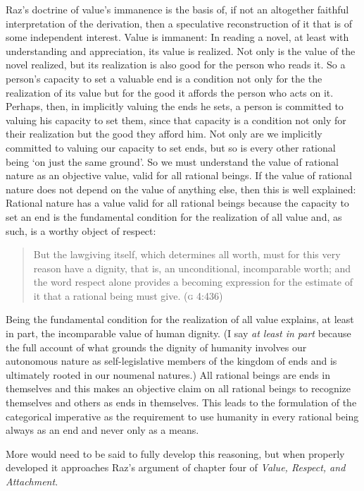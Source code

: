 \documentclass[a4paper,12pt]{article}
\begin{document}
Raz's doctrine of value's immanence is the basis of, if not an altogether faithful interpretation of the derivation, then a speculative reconstruction of it that is of some independent interest. Value is immanent: In reading a novel, at least with understanding and appreciation, its value is realized. Not only is the value of the novel realized, but its realization is also good for the person who reads it. So a person's capacity to set a valuable end is a condition not only for the the realization of its value but for the good it affords the person who acts on it. Perhaps, then, in implicitly valuing the ends he sets, a person is committed to valuing his capacity to set them, since that capacity is a condition not only for their realization but the good they afford him. Not only are we implicitly committed to valuing our capacity to set ends, but so is every other rational being `on just the same ground'. So we must understand the value of rational nature as an objective value, valid for all rational beings. If the value of rational nature does not depend on the value of anything else, then this is well explained: Rational nature has a value valid for all rational beings because the capacity to set an end is the fundamental condition for the realization of all value and, as such, is a worthy object of respect: 
\begin{quote}
	But the lawgiving itself, which determines all worth, must for this very reason have a dignity, that is, an unconditional, incomparable worth; and the word respect alone provides a becoming expression for the estimate of it that a rational being must give. (\textsc{g} 4:436) 
\end{quote}
Being the fundamental condition for the realization of all value explains, at least in part, the incomparable value of human dignity. (I say \emph{at least in part} because the full account of what grounds the dignity of humanity involves our autonomous nature as self-legislative members of the kingdom of ends and is ultimately rooted in our noumenal natures.) All rational beings are ends in themselves and this makes an objective claim on all rational beings to recognize themselves and others as ends in themselves. This leads to the formulation of the categorical imperative as the requirement to use humanity in every rational being always as an end and never only as a means.

More would need to be said to fully develop this reasoning, but when properly developed it approaches Raz's argument of chapter four of \emph{Value, Respect, and Attachment}. 
\end{document}
